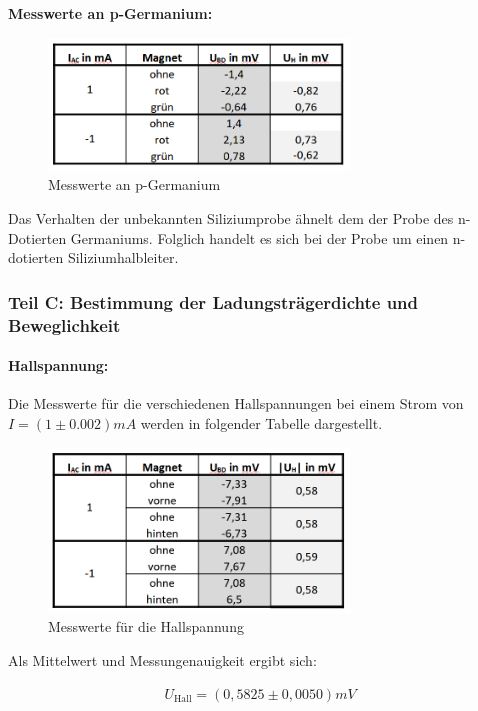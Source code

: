 \documentclass[a4paper]{scrartcl}
\numberwithin{equation}{subsection}
\begin{document}
\textbf{Messwerte an p-Germanium:\\}

\begin{figure}[H]
\includegraphics[width=8cm]{tabelle_messwerte_p-germanium}
\centering
\caption{Messwerte an p-Germanium}
\centering
\label{fig:tabelle_messwerte_p-germanium}
\end{figure}

Das Verhalten der unbekannten Siliziumprobe ähnelt dem der Probe des n-Dotierten Germaniums. Folglich handelt es sich bei der Probe um einen n-dotierten Siliziumhalbleiter.

\subsubsection{Teil C: Bestimmung der Ladungsträgerdichte und Beweglichkeit}

\paragraph{Hallspannung:\\}
Die Messwerte für die verschiedenen Hallspannungen bei einem Strom von $I = (1\pm0.002)mA$ werden in folgender Tabelle dargestellt.

\begin{figure}[H]
\includegraphics[width=8cm]{tabelle_messwerte_hallspannung}
\centering
\caption{Messwerte für die Hallspannung}
\centering
\label{fig:tabelle_messwerte_hallspannung}
\end{figure}

Als Mittelwert und Messungenauigkeit ergibt sich:

\begin{align*}
U_{\text{Hall}} = (0,5825\pm0,0050)mV
\end{align*}
\end{document}
